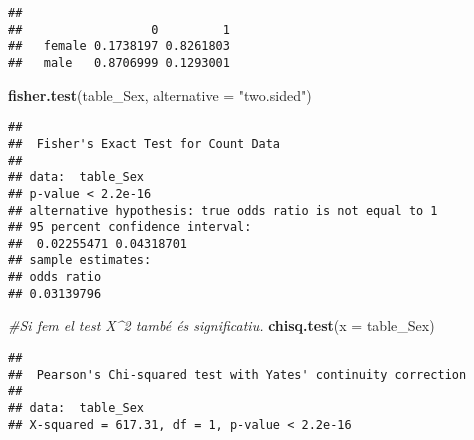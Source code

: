 \documentclass[]{article}
\newenvironment{Shaded}{\begin{snugshade}}{\end{snugshade}}
\newcommand{\CommentTok}[1]{\textcolor[rgb]{0.56,0.35,0.01}{\textit{#1}}}
\newcommand{\DataTypeTok}[1]{\textcolor[rgb]{0.13,0.29,0.53}{#1}}
\newcommand{\DecValTok}[1]{\textcolor[rgb]{0.00,0.00,0.81}{#1}}
\newcommand{\KeywordTok}[1]{\textcolor[rgb]{0.13,0.29,0.53}{\textbf{#1}}}
\newcommand{\NormalTok}[1]{#1}
\newcommand{\OperatorTok}[1]{\textcolor[rgb]{0.81,0.36,0.00}{\textbf{#1}}}
\newcommand{\StringTok}[1]{\textcolor[rgb]{0.31,0.60,0.02}{#1}}
\begin{document}
\begin{Shaded}
\end{Shaded}

\begin{verbatim}
##         
##                  0         1
##   female 0.1738197 0.8261803
##   male   0.8706999 0.1293001
\end{verbatim}

\begin{Shaded}
\begin{Highlighting}[]
\KeywordTok{fisher.test}\NormalTok{(table_Sex, }\DataTypeTok{alternative =} \StringTok{"two.sided"}\NormalTok{)}
\end{Highlighting}
\end{Shaded}

\begin{verbatim}
## 
##  Fisher's Exact Test for Count Data
## 
## data:  table_Sex
## p-value < 2.2e-16
## alternative hypothesis: true odds ratio is not equal to 1
## 95 percent confidence interval:
##  0.02255471 0.04318701
## sample estimates:
## odds ratio 
## 0.03139796
\end{verbatim}

\begin{Shaded}
\begin{Highlighting}[]
\CommentTok{#Si fem el test X^2 també és significatiu.}
\KeywordTok{chisq.test}\NormalTok{(}\DataTypeTok{x =}\NormalTok{ table_Sex)}
\end{Highlighting}
\end{Shaded}

\begin{verbatim}
## 
##  Pearson's Chi-squared test with Yates' continuity correction
## 
## data:  table_Sex
## X-squared = 617.31, df = 1, p-value < 2.2e-16
\end{verbatim}

\begin{Shaded}
\end{Shaded}
\end{document}
